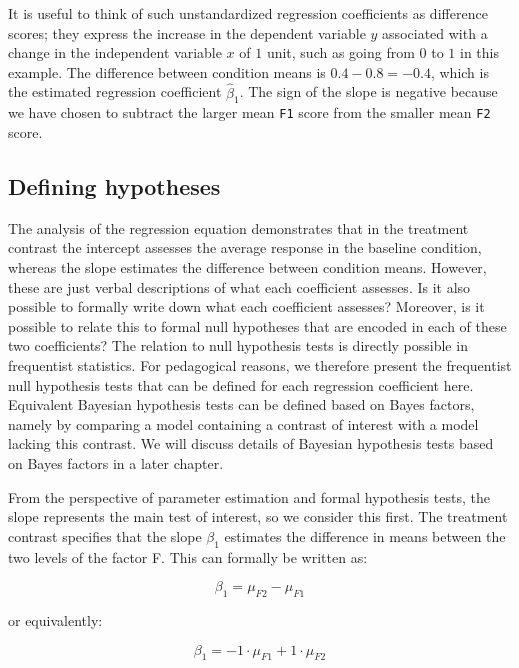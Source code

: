 \documentclass[12pt,]{krantz}
\theoremstyle{definition}
\theoremstyle{definition}
\theoremstyle{definition}
\theoremstyle{remark}
\begin{document}
It is useful to think of such unstandardized regression coefficients as
difference scores; they express the increase in the dependent variable
\(y\) associated with a change in the independent variable \(x\) of
\(1\) unit, such as going from \(0\) to \(1\) in this example. The
difference between condition means is \(0.4 - 0.8 = -0.4\), which is the
estimated regression coefficient \(\hat{\beta}_1\). The sign of the
slope is negative because we have chosen to subtract the larger mean
\texttt{F1} score from the smaller mean \texttt{F2} score.

\subsection{Defining hypotheses}\label{inverseMatrix}

The analysis of the regression equation demonstrates that in the
treatment contrast the intercept assesses the average response in the
baseline condition, whereas the slope estimates the difference between
condition means. However, these are just verbal descriptions of what
each coefficient assesses. Is it also possible to formally write down
what each coefficient assesses? Moreover, is it possible to relate this
to formal null hypotheses that are encoded in each of these two
coefficients? The relation to null hypothesis tests is directly possible
in frequentist statistics. For pedagogical reasons, we therefore present
the frequentist null hypothesis tests that can be defined for each
regression coefficient here. Equivalent Bayesian hypothesis tests can be
defined based on Bayes factors, namely by comparing a model containing a
contrast of interest with a model lacking this contrast. We will discuss
details of Bayesian hypothesis tests based on Bayes factors in a later
chapter.

From the perspective of parameter estimation and formal hypothesis
tests, the slope represents the main test of interest, so we consider
this first. The treatment contrast specifies that the slope \(\beta_1\)
estimates the difference in means between the two levels of the factor
F. This can formally be written as:

\begin{equation}
\beta_1 = \mu_{F2} - \mu_{F1}
\end{equation}

or equivalently:

\begin{equation}
\beta_1 = - 1 \cdot \mu_{F1} + 1 \cdot \mu_{F2}
\end{equation}
\end{document}

